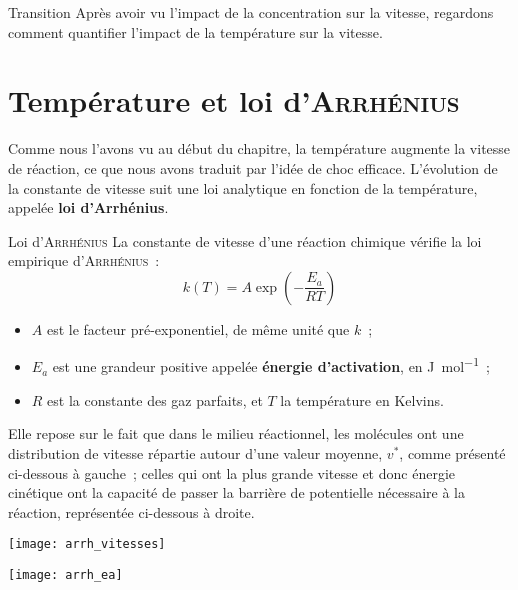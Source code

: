 \documentclass[../main/main.tex]{subfiles}
\begin{document}
\begin{instruc}[trans]{Transition}
    Après avoir vu l'impact de la concentration sur la vitesse, regardons
    comment quantifier l'impact de la température sur la vitesse.
\end{instruc}

\vspace{-15pt}
\section{Température et loi d'\textsc{Arrhénius}}
Comme nous l'avons vu au début du chapitre, la température augmente la vitesse
de réaction, ce que nous avons traduit par l'idée de choc efficace. L'évolution
de la constante de vitesse suit une loi analytique en fonction de la
température, appelée \textbf{loi d'Arrhénius}.

\begin{loi}[label=loi:arrhenius, breakable]{Loi d'\textsc{Arrhénius}}
    La constante de vitesse d'une réaction chimique vérifie la loi empirique
    d'\textsc{Arrhénius}~:
    {
    \[\boxed{k(T) = A\exp \left( - \frac{E_a}{RT} \right)}\]}\vspace{-12pt}
    \begin{itemize}
        \item $A$ est le facteur pré-exponentiel, de même unité que $k$~;
        \item $E_a$ est une grandeur positive appelée \textbf{énergie
            d'activation}, en \si{J.mol^{-1}}~;
        \item $R$ est la constante des gaz parfaits, et $T$ la température en
            Kelvins.
    \end{itemize}
\end{loi}

Elle repose sur le fait que dans le milieu réactionnel, les molécules ont une
distribution de vitesse répartie autour d'une valeur moyenne, $v^*$, comme
présenté ci-dessous à gauche~; celles qui ont la plus grande vitesse et donc
énergie cinétique ont la capacité de passer la barrière de potentielle
nécessaire à la réaction, représentée ci-dessous à droite.

\begin{minipage}{0.49\linewidth}
    \texttt{[image: arrh\_vitesses]}
\end{minipage}
\hfill
\begin{minipage}{0.49\linewidth}
    \texttt{[image: arrh\_ea]}
\end{minipage}
\end{document}
